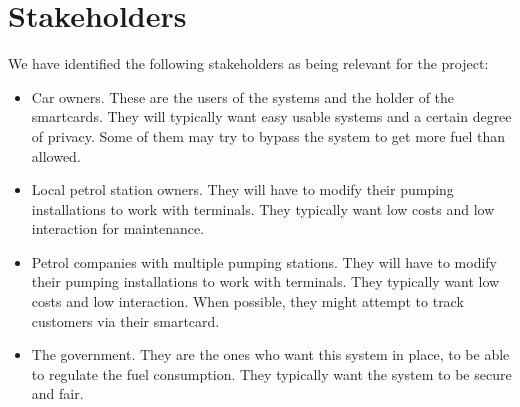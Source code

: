 \section{Stakeholders}
We have identified the following stakeholders as being relevant for the project:
\begin{itemize}
\item Car owners. These are the users of the systems and the holder of the smartcards.
They will typically want easy usable systems and a certain degree of privacy. 
Some of them may try to bypass the system to get more fuel than allowed.

\item Local petrol station owners. They will have to modify their pumping installations to 
work with terminals. They typically want low costs and low interaction for maintenance.

\item Petrol companies with multiple pumping stations. They will have to modify their
pumping installations to work with terminals. They typically want low costs and 
low interaction. When possible, they might attempt to track customers via their smartcard.

\item The government. They are the ones who want this system in place, to be able to regulate
the fuel consumption. They typically want the system to be secure and fair.
\end{itemize}

